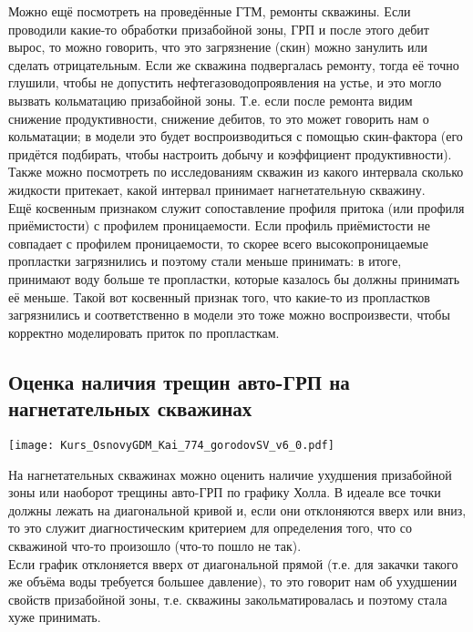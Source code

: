 \documentclass[main.tex]{subfiles}
\begin{document}
Можно ещё посмотреть на проведённые ГТМ, ремонты скважины.
Если проводили какие-то обработки призабойной зоны, ГРП и после этого дебит вырос, то можно говорить, что это загрязнение (скин) можно занулить или сделать отрицательным.
Если же скважина подвергалась ремонту, тогда её точно глушили, чтобы не допустить нефтегазоводопроявления на устье, и это могло вызвать кольматацию призабойной зоны.
Т.е. если после ремонта видим снижение продуктивности, снижение дебитов, то это может говорить нам о кольматации; в модели это будет воспроизводиться с помощью скин-фактора (его придётся подбирать, чтобы настроить добычу и коэффициент продуктивности).
\\

Также можно посмотреть по исследованиям скважин из какого интервала сколько жидкости притекает, какой интервал принимает нагнетательную скважину.
\\

Ещё косвенным признаком служит сопоставление профиля притока (или профиля приёмистости) с профилем проницаемости.
Если профиль приёмистости не совпадает с профилем проницаемости, то скорее всего высокопроницаемые пропластки загрязнились и поэтому стали меньше принимать: в итоге, принимают воду больше те пропластки, которые казалось бы должны принимать её меньше.
Такой вот косвенный признак того, что какие-то из пропластков загрязнились и соответственно в модели это тоже можно воспроизвести, чтобы корректно моделировать приток по пропласткам.

\subsection{Оценка наличия трещин авто-ГРП на нагнетательных скважинах}

\texttt{[image: Kurs\_OsnovyGDM\_Kai\_774\_gorodovSV\_v6\_0.pdf]}

На нагнетательных скважинах можно оценить наличие ухудшения призабойной зоны или наоборот трещины авто-ГРП по графику Холла.
В идеале все точки должны лежать на диагональной кривой и, если они отклоняются вверх или вниз, то это служит диагностическим критерием для определения того, что со скважиной что-то произошло (что-то пошло не так).
\\

Если график отклоняется вверх от диагональной прямой (т.е. для закачки такого же объёма воды требуется большее давление), то это говорит нам об ухудшении свойств призабойной зоны, т.е. скважины закольматировалась и поэтому стала хуже принимать.
\end{document}
